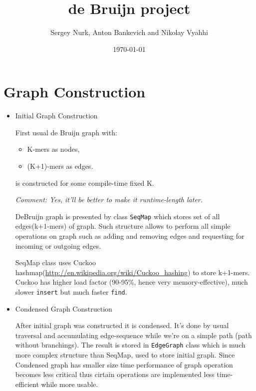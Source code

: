 \documentclass[14pt]{article}
\title{de Bruijn project}
\author{Sergey Nurk, Anton Bankevich and Nikolay Vyahhi}
\date{\today}
\begin{document}
\maketitle

\section{Graph Construction}
\begin{itemize}
\item Initial Graph Construction

First usual de Bruijn graph with:
\begin{itemize}
\item K-mers as nodes,
\item (K+1)-mers as edges.
\end{itemize}
is constructed for some compile-time fixed K. 

\textit{Comment: Yes, it'll be better to make it runtime-length later.}

DeBruijn graph is presented by class \texttt{SeqMap} which stores set of all edges(k+1-mers) of graph. Such structure allows to perform all simple operations on graph such as adding and removing edges and requesting for incoming or outgoing edges.

SeqMap class uses Cuckoo hashmap(\url{http://en.wikipedia.org/wiki/Cuckoo_hashing}) to store k+1-mers. Cuckoo has higher load factor (90-95\%, hence very memory-effective), much slower \texttt{insert} but much faster \texttt{find}.

\item Condensed Graph Construction

After initial graph was constructed it is condensed. It's done by usual traversal and accumulating edge-sequence while we're on a simple path (path without branchings). The result is stored in \texttt{EdgeGraph} class which is much more complex structure than SeqMap, used to store initial graph. Since Condensed graph has smaller size time performance of graph operation becomes less critical thus cirtain operations are implemented less time-efficient while more usable.
\end{itemize}
\end{document}
